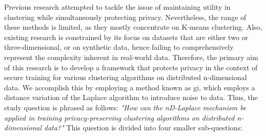 Previous research attempted to tackle the issue of maintaining utility in clustering while simultaneously protecting privacy. Nevertheless, the range of these methods is limited, as they mostly concentrate on K-means clustering. Also, existing research is constrained by its focus on datasets that are either two or three-dimensional, or on synthetic data, hence failing to comprehensively represent the complexity inherent in real-world data. 
Therefore, the primary aim of this research is to develop a framework that protects privacy in the context of secure training for various clustering algorithms on distributed n-dimensional data. \newline
We accomplish this by employing a method known as \gls{gi}, which employs a distance variation of the Laplace algorithm to introduce noise to data. Thus, the study question is phrased as follows:
\newline 
\textit{"How can the nD-Laplace mechanism be applied in training privacy-preserving clustering algorithms on distributed n-dimensional data?"} \newline
This question is divided into four smaller sub-questions:
